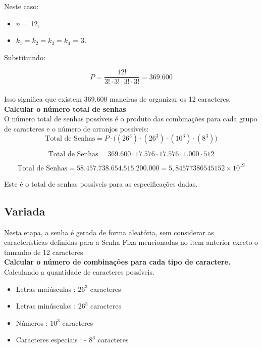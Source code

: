 Neste caso:
\begin{itemize}
    \item $n$ = 12,
    \item $k_1 = k_2 = k_3 = k_4$  = 3.
\end{itemize}

Substituindo:

\[
P = {\frac{12!}{3! \cdot 3! \cdot 3! \cdot 3!}} { = 369.600}
\]\\

Isso significa que existem 369.600 maneiras de organizar os 12 caracteres.\\

\textbf{Calcular o número total de senhas}\\

O número total de senhas possíveis é o produto das combinações para cada grupo de caracteres e o número de arranjos possíveis:\\

\[
\text{Total de Senhas} = P \cdot \big( (26^3) \cdot (26^3) \cdot (10^3) \cdot (8^3) \big)
\]

\[
\text{Total de Senhas} = 369.600 \cdot 17.576 \cdot 17.576 \cdot 1.000 \cdot 512
\]

\[
\text{Total de Senhas} = 58.457.738.654.515.200.000 = 5,84577386545152 \times 10^{19}
\]

Este é o total de senhas possíveis para as especificações dadas.

\subsection{Variada}

Nesta etapa, a senha é gerada de forma aleatória, sem considerar as características definidas para a Senha Fixa mencionadas no item anterior exceto o tamanho de 12 caracteres.\\

\textbf{Calcular o número de combinações para cada tipo de caractere.}\\
Calculando a quantidade de caracteres possíveis.
\begin{itemize}
	\item Letras maiúsculas : $26^3$ caracteres
	\item Letras minúsculas : $26^3$ caracteres
	\item Números : $10^3$ caracteres
	\item Caracteres especiais :  - $8^3$ caracteres
\end{itemize}

